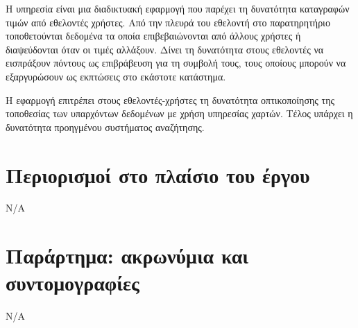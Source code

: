 \documentclass[a4paper,oneside, 12pt]{article}
\begin{document}
Η υπηρεσία είναι μια διαδικτυακή εφαρμογή που παρέχει τη δυνατότητα καταγραφών τιμών από εθελοντές χρήστες. Από την πλευρά του εθελοντή στο παρατηρητήριο  τοποθετούνται δεδομένα τα οποία επιβεβαιώνονται από άλλους χρήστες ή διαψεύδονται όταν οι τιμές αλλάξουν. Δίνει τη δυνατότητα στους εθελοντές να εισπράξουν πόντους ως επιβράβευση για τη συμβολή τους, τους οποίους μπορούν να εξαργυρώσουν ως εκπτώσεις στο εκάστοτε κατάστημα. 

Η εφαρμογή επιτρέπει στους εθελοντές-χρήστες τη δυνατότητα οπτικοποίησης της τοποθεσίας των υπαρχόντων δεδομένων με χρήση υπηρεσίας χαρτών. Τέλος υπάρχει η δυνατότητα προηγμένου συστήματος αναζήτησης.

\section{Περιορισμοί στο πλαίσιο του έργου}

Ν/Α

\section{Παράρτημα: ακρωνύμια και συντομογραφίες}

Ν/Α
\end{document}
